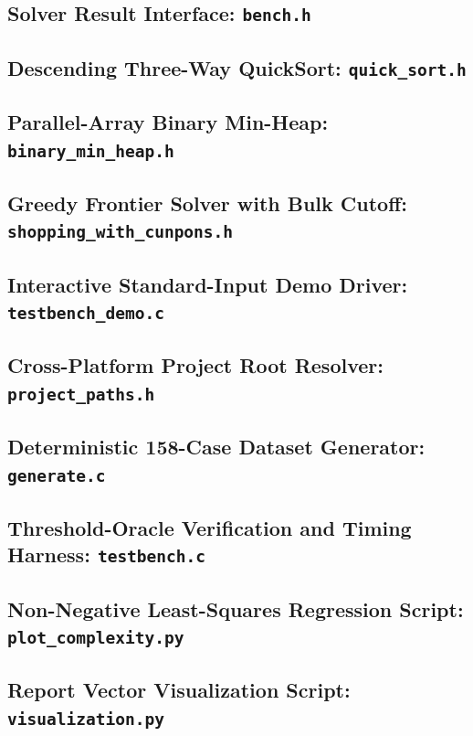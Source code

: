 \documentclass[10pt, a4paper]{article}
\begin{document}
\subsection{Solver Result Interface: \texttt{bench.h}}


\subsection{Descending Three-Way QuickSort: \texttt{quick\_sort.h}}


\subsection{Parallel-Array Binary Min-Heap: \texttt{binary\_min\_heap.h}}


\subsection{Greedy Frontier Solver with Bulk Cutoff: \texttt{shopping\_with\_cunpons.h}}


\subsection{Interactive Standard-Input Demo Driver: \texttt{testbench\_demo.c}}


\subsection{Cross-Platform Project Root Resolver: \texttt{project\_paths.h}}


\subsection{Deterministic 158-Case Dataset Generator: \texttt{generate.c}}


\subsection{Threshold-Oracle Verification and Timing Harness: \texttt{testbench.c}}


\subsection{Non-Negative Least-Squares Regression Script: \texttt{plot\_complexity.py}}


\subsection{Report Vector Visualization Script: \texttt{visualization.py}}

\end{document}
